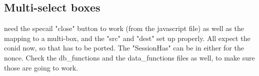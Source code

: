 \documentclass[captions=tablesignature]{scrartcl}
\begin{document}
\subsection{Multi-select boxes}
\label{sec-2-7}
need the specail "close" button to work (from the javascript file)
as well as the mapping to a multi-box, and the "src" and "dest" set
up properly.  All expect the conid now, so that has to be ported.
The "SessionHas" can be in either for the nonce.  Check the
db\_functions and the data\_functions files as well, to make sure
those are going to work.
\end{document}
